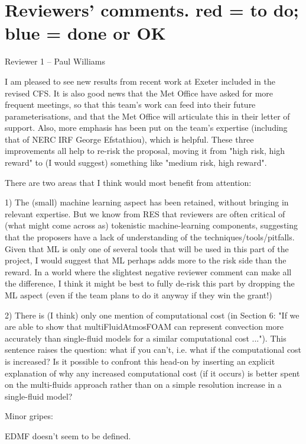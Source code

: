 \documentclass[11pt,a4paper]{article}
\begin{document}
{\color{red}
\section{Reviewers' comments. red = to do; {\color{blue} blue = done or OK}}

{\color{blue}
Reviewer 1 – Paul Williams

I am pleased to see new results from recent work at Exeter included in the revised CFS.  It is also good news that the Met Office have asked for more frequent meetings, so that this team's work can feed into their future parameterisations, and that the Met Office will articulate this in their letter of support.  Also, more emphasis has been put on the team's expertise (including that of NERC IRF George Efstathiou), which is helpful.  These three improvements all help to re-risk the proposal, moving it from "high risk, high reward" to (I would suggest) something like "medium risk, high reward".
}

There are two areas that I think would most benefit from attention: 

{\color{blue}
1) The (small) machine learning aspect has been retained, without bringing in relevant expertise.  But we know from RES that reviewers are often critical of (what might come across as) tokenistic machine-learning components, suggesting that the proposers have a lack of understanding of the techniques/tools/pitfalls.  Given that ML is only one of several tools that will be used in this part of the project, I would suggest that ML perhaps adds more to the risk side than the reward.  In a world where the slightest negative reviewer comment can make all the difference, I think it might be best to fully de-risk this part by dropping the ML aspect (even if the team plans to do it anyway if they win the grant!)
}

2) There is (I think) only one mention of computational cost (in Section 6: "If we are able to show that multiFluidAtmosFOAM can represent convection more accurately than single-fluid models for a similar computational cost ...").  This sentence raises the question: what if you can't, i.e. what if the computational cost is increased?  Is it possible to confront this head-on by inserting an explicit explanation of why any increased computational cost (if it occurs) is better spent on the multi-fluids approach rather than on a simple resolution increase in a single-fluid model? 

{\color{blue}
Minor gripes: 

EDMF doesn't seem to be defined.} 

}
\end{document}

